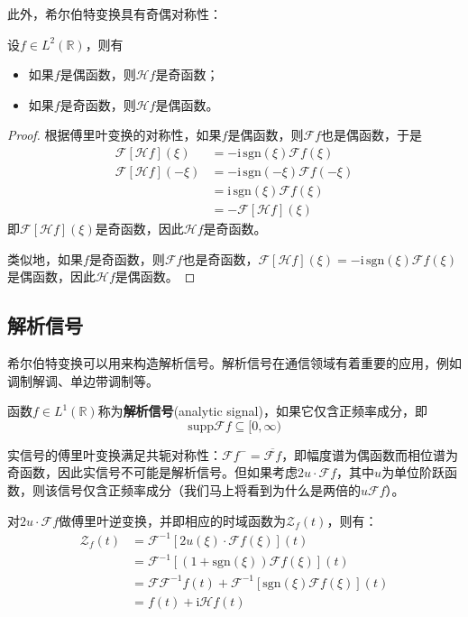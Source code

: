 此外，希尔伯特变换具有奇偶对称性：
\begin{theorem}
    设$f\in L^2(\mathbb{R})$，则有
    \begin{itemize}
        \item 如果$f$是偶函数，则$\mathcal{H} f$是奇函数；
        \item 如果$f$是奇函数，则$\mathcal{H} f$是偶函数。
    \end{itemize}
\end{theorem}
\begin{proof}
    根据傅里叶变换的对称性，如果$f$是偶函数，则$\mathcal{F} f$也是偶函数，于是\begin{align*}
        \mathcal{F} [\mathcal{H} f](\xi)&=-\mathrm{i}\,\text{sgn}(\xi)\mathcal{F} f(\xi)\\
        \mathcal{F}[\mathcal{H} f](-\xi)&=-\mathrm{i}\,\text{sgn}(-\xi)\mathcal{F} f(-\xi)\\
        &=\mathrm{i}\,\text{sgn}(\xi)\mathcal{F} f(\xi)\\
        &=-\mathcal{F} [\mathcal{H} f](\xi)
    \end{align*}
    即$\mathcal{F} [\mathcal{H} f](\xi)$是奇函数，因此$\mathcal{H} f$是奇函数。
    
    类似地，如果$f$是奇函数，则$\mathcal{F} f$也是奇函数，$\mathcal{F} [\mathcal{H} f](\xi)=-\mathrm{i}\,\text{sgn}(\xi)\mathcal{F} f(\xi)$是偶函数，因此$\mathcal{H} f$是偶函数。
\end{proof}

\subsection{解析信号}\label{sub:analytic_signal}

希尔伯特变换可以用来构造解析信号。解析信号在通信领域有着重要的应用，例如调制解调、单边带调制等。
\begin{definition}[解析信号]
    函数$f\in L^1(\mathbb{R})$称为\textbf{解析信号}(analytic signal)，如果它仅含正频率成分，即
    \[\text{supp}\mathcal{F} f\subseteq[0,\infty)\]
\end{definition}

实信号的傅里叶变换满足共轭对称性：$\mathcal{F} f^-=\overline{\mathcal{F} f}$，即幅度谱为偶函数而相位谱为奇函数，因此实信号不可能是解析信号。但如果考虑$2u\cdot\mathcal{F} f$，其中$u$为单位阶跃函数，则该信号仅含正频率成分（我们马上将看到为什么是两倍的$u\mathcal{F} f$）。

对$2u\cdot\mathcal{F} f$做傅里叶逆变换，并即相应的时域函数为$\mathcal{Z}_f(t)$，则有：
\begin{align*}
    \mathcal{Z}_f(t)&=\mathcal{F} ^{-1}[2u(\xi)\cdot\mathcal{F} f(\xi)](t)\\
    &=\mathcal{F} ^{-1}[(1+\text{sgn}(\xi))\mathcal{F} f(\xi)](t)\\
    &=\mathcal{F} \mathcal{F} ^{-1}f(t)+\mathcal{F} ^{-1}[\text{sgn}(\xi)\mathcal{F} f(\xi)](t)\\
    &=f(t)+\mathrm{i}\mathcal{H} f(t)
\end{align*}

